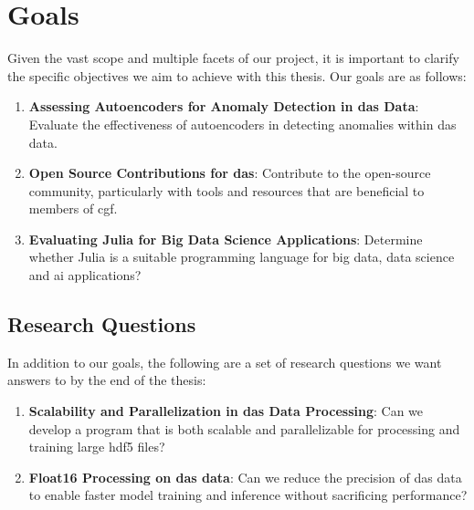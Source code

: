 \section{Goals}

Given the vast scope and multiple facets of our project, it is important to clarify the specific objectives we aim to achieve with this thesis. Our goals are as follows:

\begin{enumerate}
    \item \textbf{Assessing Autoencoders for Anomaly Detection in \acrshort{das} Data}: Evaluate the effectiveness of autoencoders in detecting anomalies within \acrshort{das} data.
    \item \textbf{Open Source Contributions for \acrshort{das}}: Contribute to the open-source community, particularly with tools and resources that are beneficial to members of \acrshort{cgf}.
    \item \textbf{Evaluating Julia for Big Data Science Applications}: Determine whether Julia is a suitable programming language for big data, data science and \acrshort{ai} applications?
\end{enumerate}


\subsection{Research Questions}

In addition to our goals, the following are a set of research questions we want answers to by the end of the thesis:

\begin{enumerate}
    \item \textbf{Scalability and Parallelization in \acrshort{das} Data Processing}: Can we develop a program that is both scalable and parallelizable for processing and training large \acrshort{hdf5} files?
    \item \textbf{Float16 Processing on \acrshort{das} data}: Can we reduce the precision of \acrshort{das} data to enable faster model training and inference without sacrificing performance?
\end{enumerate}
